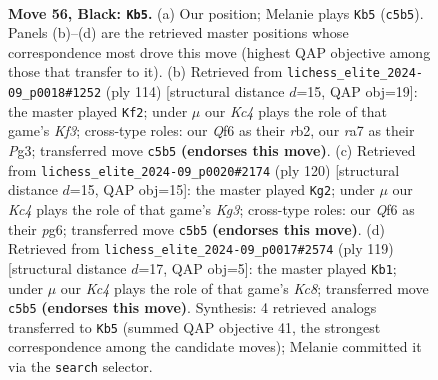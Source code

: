 \documentclass[11pt]{article}
\begin{document}
\clearpage

\begin{figure}[p]\centering
\begin{subfigure}{0.46\textwidth}\centering
\resizebox{\linewidth}{!}{%
\newchessgame
\chessboard[
  setfen={8/R7/5q2/2k5/1p6/b4BK1/8/8 b - - 3 56},
  showmover=false,
  pgfstyle=straightmove, color=movearrow, markmove={c5-b5}
]}
\caption{}
\end{subfigure}\hfill
\begin{subfigure}{0.46\textwidth}\centering
\resizebox{\linewidth}{!}{%
\newchessgame
\chessboard[
  setfen={8/8/8/4k3/8/5KP1/1r2B2P/8 w - - 8 58},
  showmover=false,
  pgfstyle=straightmove, color=movearrow, markmove={f3-f2}
]}
\caption{}
\end{subfigure}
\\[4pt]
\begin{subfigure}{0.46\textwidth}\centering
\resizebox{\linewidth}{!}{%
\newchessgame
\chessboard[
  setfen={8/5k2/6p1/4r3/8/4B1K1/5P2/8 w - - 8 61},
  showmover=false,
  pgfstyle=straightmove, color=movearrow, markmove={g3-g2}
]}
\caption{}
\end{subfigure}\hfill
\begin{subfigure}{0.46\textwidth}\centering
\resizebox{\linewidth}{!}{%
\newchessgame
\chessboard[
  setfen={8/8/8/8/2R5/8/1p6/b1k1K3 b - - 9 60},
  showmover=false,
  pgfstyle=straightmove, color=movearrow, markmove={c1-b1}
]}
\caption{}
\end{subfigure}
\caption{\textbf{Move 56, Black: \texttt{Kb5}.} (a) Our position; Melanie plays \texttt{Kb5} (\texttt{c5b5}). Panels (b)--(d) are the retrieved master positions whose correspondence most drove this move (highest QAP objective among those that transfer to it). (b) Retrieved from \texttt{lichess\_elite\_2024-09\_p0018\#1252} (ply 114) [structural distance $d$=15, QAP obj=19]: the master played \texttt{Kf2}; under $\mu$ our \emph{Kc4} plays the role of that game's \emph{Kf3}; cross-type roles: our \emph{Q}f6 as their \emph{r}b2, our \emph{r}a7 as their \emph{P}g3; transferred move \texttt{c5b5} \textbf{(endorses this move)}. (c) Retrieved from \texttt{lichess\_elite\_2024-09\_p0020\#2174} (ply 120) [structural distance $d$=15, QAP obj=15]: the master played \texttt{Kg2}; under $\mu$ our \emph{Kc4} plays the role of that game's \emph{Kg3}; cross-type roles: our \emph{Q}f6 as their \emph{p}g6; transferred move \texttt{c5b5} \textbf{(endorses this move)}. (d) Retrieved from \texttt{lichess\_elite\_2024-09\_p0017\#2574} (ply 119) [structural distance $d$=17, QAP obj=5]: the master played \texttt{Kb1}; under $\mu$ our \emph{Kc4} plays the role of that game's \emph{Kc8}; transferred move \texttt{c5b5} \textbf{(endorses this move)}. Synthesis: 4 retrieved analogs transferred to \texttt{Kb5} (summed QAP objective 41, the strongest correspondence among the candidate moves); Melanie committed it via the \texttt{search} selector.}
\label{fig:thought-m111}
\end{figure}
\end{document}
